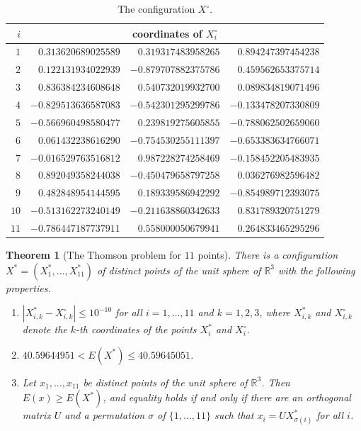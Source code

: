 \documentclass[reqno,a4paper,11pt]{amsart}
\numberwithin{equation}{section}
\newtheorem{theorem}{Theorem}[section]
\def\R{{\mathbb R}}
\begin{document}
\begin{table}[ht]
\centering
\small
\begin{tabular}{@{}rrrr@{}}
\toprule
$i$ & \multicolumn{3}{c}{coordinates of $X^{\circ}_i$} \\
\midrule
$1$ & $0.313620689025589$ & $0.319317483958265$ & $0.894247397454238$ \\
$2$ & $0.122131934022939$ & $-0.879707882375786$ & $0.459562653375714$ \\
$3$ & $0.836384234608648$ & $0.540732019932700$ & $0.089834819071496$ \\
$4$ & $-0.829513636587083$ & $-0.542301295299786$ & $-0.133478207330809$ \\
$5$ & $-0.566960498580477$ & $0.239819275605855$ & $-0.788062502659060$ \\
$6$ & $0.061432238616290$ & $-0.754530255111397$ & $-0.653383634766071$ \\
$7$ & $-0.016529763516812$ & $0.987228274258469$ & $-0.158452205483935$ \\
$8$ & $0.892049358244038$ & $-0.450479658797258$ & $0.036276982596482$ \\
$9$ & $0.482848954144595$ & $0.189339586942292$ & $-0.854989712393075$ \\
$10$ & $-0.513162273240149$ & $-0.211638860342633$ & $0.831789320751279$ \\
$11$ & $-0.786447187737911$ & $0.558000050679941$ & $0.264833465295296$ \\
\bottomrule
\end{tabular}
\medskip
\caption{The configuration $X^{\circ}$.}\label{tab:xcirc}
\end{table}

\begin{theorem}[The Thomson problem for $11$ points]\label{thm:thomson11}
There is a configuration $X^* = (X^*_1, \dots, X^*_{11})$ of distinct points of the unit sphere of $\R^3$ with the following properties.
\begin{enumerate}
    \item[(a)] $|X^*_{i,k} - X^{\circ}_{i,k}| \leq 10^{-10}$ for all $i = 1, \dots, 11$ and $k = 1, 2, 3$, where $X^*_{i,k}$ and $X^{\circ}_{i,k}$ denote the $k$-th coordinates of the points $X^*_i$ and $X^{\circ}_i$.
    \item[(b)] $40.59644951 < E(X^*) \leq 40.59645051$.
    \item[(c)] Let $x_1, \dots, x_{11}$ be distinct points of the unit sphere of $\R^3$. Then $E(x) \geq E(X^*)$, and equality holds if and only if there are an orthogonal matrix $U$ and a permutation $\sigma$ of $\{1, \dots, 11\}$ such that $x_i = U X^*_{\sigma(i)}$ for all $i$.
\end{enumerate}
\end{theorem}
\end{document}
